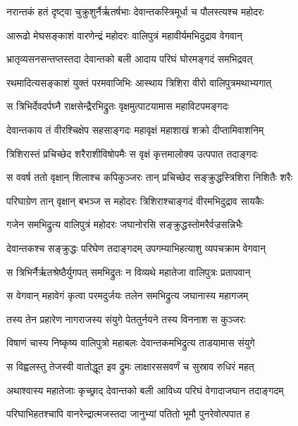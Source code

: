 
\twolineshloka
{नरान्तकं हतं दृष्ट्वा चुक्रुशुर्नैर्ऋतर्षभाः}
{देवान्तकस्त्रिमूर्धा च पौलस्त्यश्च महोदरः} %

\twolineshloka
{आरूढो मेघसङ्काशं वारणेन्द्रं महोदरः}
{वालिपुत्रं महावीर्यमभिदुद्राव वेगवान्} %

\twolineshloka
{भ्रातृव्यसनसन्तप्तस्तदा देवान्तको बली}
{आदाय परिघं घोरमङ्गदं समभिद्रवत्} %

\twolineshloka
{रथमादित्यसङ्काशं युक्तं परमवाजिभिः}
{आस्थाय त्रिशिरा वीरो वालिपुत्रमथाभ्यगात्} %

\twolineshloka
{स त्रिभिर्देवदर्पघ्नै राक्षसेन्द्रैरभिद्रुतः}
{वृक्षमुत्पाटयामास महाविटपमङ्गदः} %

\twolineshloka
{देवान्तकाय तं वीरश्चिक्षेप सहसाङ्गदः}
{महावृक्षं महाशाखं शक्रो दीप्तामिवाशनिम्} %

\twolineshloka
{त्रिशिरास्तं प्रचिच्छेद शरैराशीविषोपमैः}
{स वृक्षं कृत्तमालोक्य उत्पपात तदाङ्गदः} %

\twolineshloka
{स ववर्ष ततो वृक्षान् शिलाश्च कपिकुञ्जरः}
{तान् प्रचिच्छेद सङ्क्रुद्धस्त्रिशिरा निशितैः शरैः} %

\twolineshloka
{परिघाग्रेण तान् वृक्षान् बभञ्ज स महोदरः}
{त्रिशिराश्चाङ्गदं वीरमभिदुद्राव सायकैः} %

\twolineshloka
{गजेन समभिद्रुत्य वालिपुत्रं महोदरः}
{जघानोरसि सङ्क्रुद्धस्तोमरैर्वज्रसन्निभैः} %

\twolineshloka
{देवान्तकश्च सङ्क्रुद्धः परिघेण तदाङ्गदम्}
{उपगम्याभिहत्याशु व्यपचक्राम वेगवान्} %

\twolineshloka
{स त्रिभिर्नैर्ऋतश्रेष्ठैर्युगपत् समभिद्रुतः}
{न विव्यथे महातेजा वालिपुत्रः प्रतापवान्} %

\twolineshloka
{स वेगवान् महावेगं कृत्वा परमदुर्जयः}
{तलेन समभिद्रुत्य जघानास्य महागजम्} %

\twolineshloka
{तस्य तेन प्रहारेण नागराजस्य संयुगे}
{पेततुर्नयने तस्य विननाश स कुञ्जरः} %

\twolineshloka
{विषाणं चास्य निष्कृष्य वालिपुत्रो महाबलः}
{देवान्तकमभिद्रुत्य ताडयामास संयुगे} %

\twolineshloka
{स विह्वलस्तु तेजस्वी वातोद्धूत इव द्रुमः}
{लाक्षारससवर्णं च सुस्राव रुधिरं महत्} %

\twolineshloka
{अथाश्वास्य महातेजाः कृच्छ्राद् देवान्तको बली}
{आविध्य परिघं वेगादाजघान तदाङ्गदम्} %

\twolineshloka
{परिघाभिहतश्चापि वानरेन्द्रात्मजस्तदा}
{जानुभ्यां पतितो भूमौ पुनरेवोत्पपात ह} %


